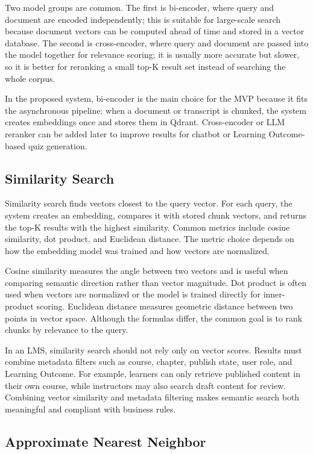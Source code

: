 Two model groups are common. The first is bi-encoder, where query and
document are encoded independently; this is suitable for large-scale
search because document vectors can be computed ahead of time and stored
in a vector database. The second is cross-encoder, where query and
document are passed into the model together for relevance scoring; it is
usually more accurate but slower, so it is better for reranking a small
top-K result set instead of searching the whole corpus.

In the proposed system, bi-encoder is the main choice for the MVP because
it fits the asynchronous pipeline: when a document or transcript is
chunked, the system creates embeddings once and stores them in Qdrant.
Cross-encoder or LLM reranker can be added later to improve results for
chatbot or Learning Outcome-based quiz generation.

\subsection{Similarity Search}
\label{subsec:similarity-search}

Similarity search finds vectors closest to the query vector. For each
query, the system creates an embedding, compares it with stored chunk
vectors, and returns the top-K results with the highest similarity. Common
metrics include cosine similarity, dot product, and Euclidean distance.
The metric choice depends on how the embedding model was trained and how
vectors are normalized.

Cosine similarity measures the angle between two vectors and is useful
when comparing semantic direction rather than vector magnitude. Dot
product is often used when vectors are normalized or the model is trained
directly for inner-product scoring. Euclidean distance measures geometric
distance between two points in vector space. Although the formulas differ,
the common goal is to rank chunks by relevance to the query.

In an LMS, similarity search should not rely only on vector scores.
Results must combine metadata filters such as course, chapter, publish
state, user role, and Learning Outcome. For example, learners can only
retrieve published content in their own course, while instructors may also
search draft content for review. Combining vector similarity and metadata
filtering makes semantic search both meaningful and compliant with
business rules.

\subsection{Approximate Nearest Neighbor}
\label{subsec:approximate-nearest-neighbor}

